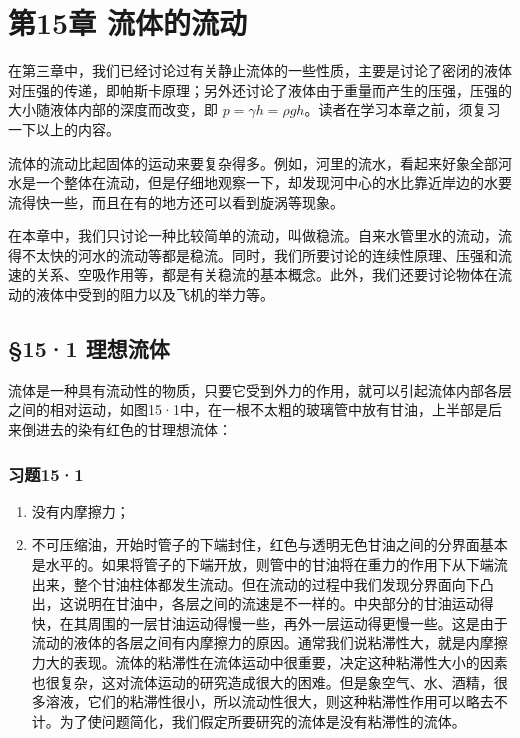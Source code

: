 \chapter{第15章
流体的流动}\label{ux7b2c15ux7ae0-ux6d41ux4f53ux7684ux6d41ux52a8}

在第三章中，我们已经讨论过有关静止流体的一些性质，主要是讨论了密闭的液体对压强的传递，即帕斯卡原理；另外还讨论了液体由于重量而产生的压强，压强的大小随液体内部的深度而改变，即
\(p = \gamma h = \rho gh\)。读者在学习本章之前，须复习一下以上的内容。

流体的流动比起固体的运动来要复杂得多。例如，河里的流水，看起来好象全部河水是一个整体在流动，但是仔细地观察一下，却发现河中心的水比靠近岸边的水要流得快一些，而且在有的地方还可以看到旋涡等现象。

在本章中，我们只讨论一种比较简单的流动，叫做稳流。自来水管里水的流动，流得不太快的河水的流动等都是稳流。同时，我们所要讨论的连续性原理、压强和流速的关系、空吸作用等，都是有关稳流的基本概念。此外，我们还要讨论物体在流动的液体中受到的阻力以及飞机的举力等。

\section{§15·1 理想流体}\label{ux7406ux60f3ux6d41ux4f53}

流体是一种具有流动性的物质，只要它受到外力的作用，就可以引起流体内部各层之间的相对运动，如图15·1中，在一根不太粗的玻璃管中放有甘油，上半部是后来倒进去的染有红色的甘理想流体：

\subsection{习题15·1}\label{ux4e60ux9898151}

\begin{enumerate}
\def\labelenumi{\arabic{enumi}.}
\item
  没有内摩擦力；
\item
  不可压缩油，开始时管子的下端封住，红色与透明无色甘油之间的分界面基本是水平的。如果将管子的下端开放，则管中的甘油将在重力的作用下从下端流出来，整个甘油柱体都发生流动。但在流动的过程中我们发现分界面向下凸出，这说明在甘油中，各层之间的流速是不一样的。中央部分的甘油运动得快，在其周围的一层甘油运动得慢一些，再外一层运动得更慢一些。这是由于流动的液体的各层之间有内摩擦力的原因。通常我们说粘滞性大，就是内摩擦力大的表现。流体的粘滞性在流体运动中很重要，决定这种粘滞性大小的因素也很复杂，这对流体运动的研究造成很大的困难。但是象空气、水、酒精，很多溶液，它们的粘滞性很小，所以流动性很大，则这种粘滞性作用可以略去不计。为了使问题简化，我们假定所要研究的流体是没有粘滞性的流体。
\end{enumerate}

